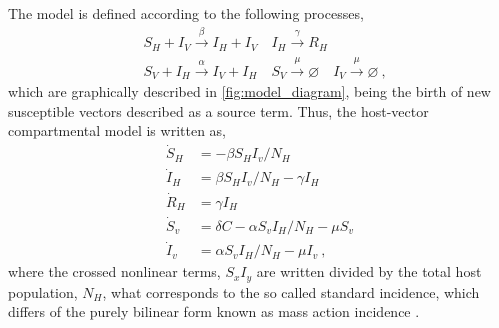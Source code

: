 The model is defined according to the following processes,
\begin{equation}\label{eq:scheme_infection}
    \begin{aligned}
         & S_H+I_V \stackrel{\beta}{\rightarrow} I_H + I_V \quad I_H
        \stackrel{\gamma}{\rightarrow} R_H                           \\
         & S_V+I_H \stackrel{\alpha}{\rightarrow} I_V+I_H \quad S_V
        \stackrel{\mu}{\rightarrow} \varnothing \quad I_V
        \stackrel{\mu}{\rightarrow}
        \varnothing
        \ ,
    \end{aligned}
\end{equation}
which are graphically described in \cref{fig:model_diagram}, being the
birth of new susceptible vectors described as a source term.
Thus, the host-vector compartmental model is written as,
\begin{equation}\label{eq:SIR_v}
    \begin{aligned}
        \dot{S}_H & =-\beta S_H I_v / N_H                     \\
        \dot{I}_H & =\beta S_H I_v / N_H - \gamma I_H         \\
        \dot{R}_H & =\gamma I_H                               \\
        \dot{S}_v & = \delta C-\alpha S_v I_H / N_H - \mu S_v \\
        \dot{I}_v & =\alpha S_v I_H / N_H - \mu I_v \ ,
    \end{aligned}
\end{equation}
where the crossed nonlinear terms, $S_x I_y$ are written divided by the
total host population, $N_H$, what corresponds to the so called standard
incidence, which differs of the purely bilinear form known as mass action
incidence \cite{MartchevaBook}.

